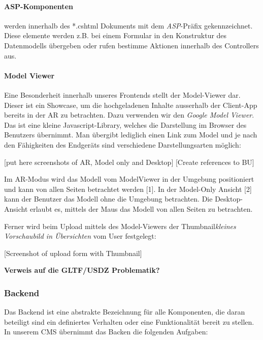 \documentclass[titlepage, a4paper, 11pt]{scrartcl}
\begin{document}
        \paragraph{ASP-Komponenten} werden innerhalb des *.cshtml Dokuments mit dem \textit{ASP}-Präfix gekennzeichnet. Diese elemente werden z.B. bei einem Formular in den Konstruktur
        des Datenmodells übergeben oder rufen bestimme Aktionen innerhalb des Controllers aus.
        
        \paragraph{Model Viewer}

          Eine Besonderheit innerhalb unseres Frontends stellt der Model-Viewer dar. Dieser ist ein Showcase, um die hochgeladenen Inhalte ausserhalb der Client-App bereits in der AR zu betrachten.
          Dazu verwenden wir den \textit{Google Model Viewer}\cite{ModelViewer:online}. Das ist eine kleine Javascript-Library, welches die Darstellung im Browser des Benutzers übernimmt.
          Man übergibt lediglich einen Link zum Model und je nach den Fähigkeiten des Endgeräts sind verschiedene Darstellungsarten möglich:

          [put here screenshots of AR, Model only and Desktop]
          [Create references to BU]

          Im AR-Modus wird das Modell vom ModelViewer in der Umgebung positioniert und kann von allen Seiten betrachtet werden [1]. 
          In der Model-Only Ansicht [2] kann der Benutzer das Modell ohne die Umgebung betrachten.
          Die Desktop-Ansicht erlaubt es, mittels der Maus das Modell von allen Seiten zu betrachten.

          Ferner wird beim Upload mittels des Model-Viewers der Thumbnail\textit{kleines Vorschaubild in Übersichten} vom User festgelegt:

          [Screenshot of upload form with Thumbnail]        

          \textbf{Verweis auf die GLTF/USDZ Problematik?}

      \subsubsection{Backend}

        Das Backend ist eine abstrakte Bezeichnung für alle Komponenten, die daran beteiligt sind ein definiertes Verhalten oder eine Funktionalität bereit zu stellen. 
        In unserem CMS übernimmt das Backen die folgenden Aufgaben:
\end{document}
